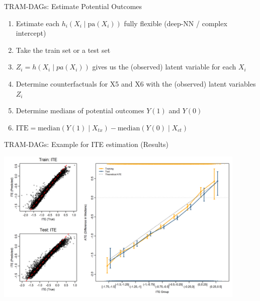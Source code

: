 \documentclass[onlytextwidth,english]{beamer}\usepackage[]{graphicx}\usepackage[]{xcolor}
\begin{document}
\begin{frame}{TRAM-DAGs: Estimate Potential Outcomes}


\begin{enumerate}
    \item Estimate each $h_i(X_i \mid \text{pa}(X_i))$ fully flexible (deep-NN / complex intercept)
    \item Take the train set or a test set
    \item $Z_i = h(X_i \mid pa(X_i))$ gives us the (observed) latent variable for each $X_i$
    \item Determine counterfactuals for X5 and X6 with the (observed) latent variables $Z_i$
    \item Determine medians of potential outcomes $Y(1)$ and $Y(0)$
    \item $\text{ITE} = \text{median}(Y(1) \mid X_{tx}) - \text{median}(Y(0) \mid X_{ct})$
\end{enumerate}

\end{frame}






\begin{frame}{TRAM-DAGs: Example for ITE estimation (Results)}


\centering
\includegraphics[width=0.9\textwidth]{img/observedITE_ATE_base.png}


\end{frame}
\end{document}

